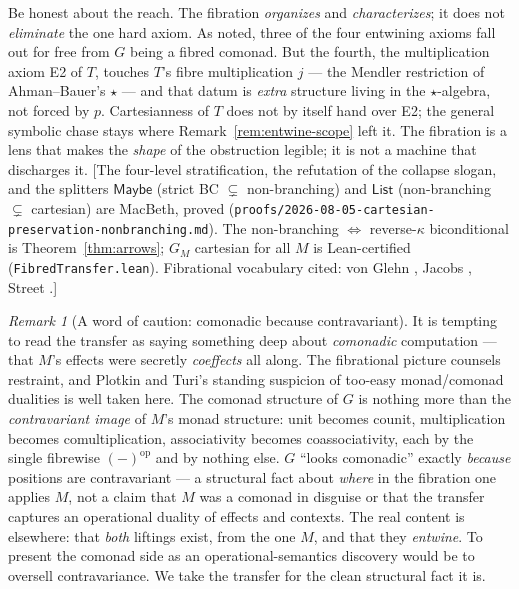 \documentclass[11pt,a4paper]{book}
\newcommand{\op}{^{\mathrm{op}}}
\theoremstyle{plain}
\theoremstyle{definition}
\theoremstyle{remark}
\newtheorem{Remark}[Theorem]{Remark}
\newcommand{\prov}[1]{\hfill\textsf{\footnotesize[#1]}}
\begin{document}
Be honest about the reach. The fibration \emph{organizes} and \emph{characterizes}; it does not
\emph{eliminate} the one hard axiom. As noted, three of the four entwining axioms fall out for free from
$G$ being a fibred comonad. But the fourth, the multiplication axiom E2 of $T$, touches $T$'s fibre
multiplication $j$ --- the Mendler restriction of Ahman--Bauer's $\star$ --- and that datum is \emph{extra}
structure living in the $\star$-algebra, not forced by $p$. Cartesianness of $T$ does not by itself hand
over E2; the general symbolic chase stays where Remark~\ref{rem:entwine-scope} left it. The fibration is a
lens that makes the \emph{shape} of the obstruction legible; it is not a machine that discharges it.
\prov{The four-level stratification, the refutation of the collapse slogan, and the splitters
$\mathsf{Maybe}$ (strict BC $\subsetneq$ non-branching) and $\mathsf{List}$ (non-branching $\subsetneq$
cartesian) are MacBeth, proved (\texttt{proofs/2026-08-05-cartesian-preservation-nonbranching.md}). The
non-branching $\Leftrightarrow$ reverse-$\kappa$ biconditional is Theorem~\ref{thm:arrows}; $G_{M}$
cartesian for all $M$ is Lean-certified (\texttt{FibredTransfer.lean}). Fibrational vocabulary cited:
von Glehn \cite{vonGlehn18}, Jacobs \cite{Jacobs99}, Street \cite{Street72}.}

\begin{Remark}[A word of caution: comonadic because contravariant]\label{rem:contravariant-caution}
It is tempting to read the transfer as saying something deep about \emph{comonadic} computation --- that
$M$'s effects were secretly \emph{coeffects} all along. The fibrational picture counsels restraint, and
Plotkin and Turi's standing suspicion of too-easy monad/comonad dualities is well taken here. The comonad
structure of $G$ is nothing more than the \emph{contravariant image} of $M$'s monad structure: unit becomes
counit, multiplication becomes comultiplication, associativity becomes coassociativity, each by the single
fibrewise $(-)\op$ and by nothing else. $G$ ``looks comonadic'' exactly \emph{because} positions are
contravariant --- a structural fact about \emph{where} in the fibration one applies $M$, not a claim that
$M$ was a comonad in disguise or that the transfer captures an operational duality of effects and contexts.
The real content is elsewhere: that \emph{both} liftings exist, from the one $M$, and that they
\emph{entwine}. To present the comonad side as an operational-semantics discovery would be to oversell
contravariance. We take the transfer for the clean structural fact it is.
\end{Remark}
\end{document}
